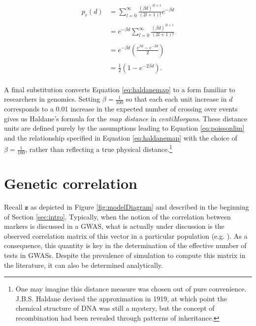 \documentclass{article}
\newcommand{\ve}[1]{\mathbf{#1}}           %
\begin{document}
\begin{equation} \label{eq:haldanemap}
  \begin{split}
    p_r(d) & = \sum_{l = 0}^{\infty} \frac{(\beta d)^{2l + 1}}{(2l + 1)!} e^{-\beta d} \\
    & \\
    & = e^{-\beta d} \sum_{l = 0}^{\infty} \frac{(\beta d)^{2l + 1}}{(2l + 1)!} \\
    & \\
    & = e^{-\beta d} \left ( \frac{e^{\beta d} - e^{- \beta d}}{2} \right ) \\
    & \\
    & = \frac{1}{2} \left ( 1 - e^{-2 \beta d} \right ) .\\
  \end{split}
\end{equation}

\noindent A final substitution converts Equation \ref{eq:haldanemap} to a form familiar to researchers in genomics. Setting $\beta = \frac{1}{100}$ so that each each unit increase in $d$ corresponds to a 0.01 increase in the expected number of crossing over events gives us Haldane's formula for the \textit{map distance} in \textit{centiMorgans}. These distance units are defined purely by the assumptions leading to Equation \ref{eq:poissonlim} and the relationship specified in Equation \ref{eq:haldanemap} with the choice of $\beta = \frac{1}{100}$, rather than reflecting a true physical distance.\footnote{One may imagine this distance measure was chosen out of pure convenience. J.B.S. Haldane devised the approximation in 1919, at which point the chemical structure of DNA was still a mystery, but the concept of recombination had been revealed through patterns of inheritance.}

\section{Genetic correlation} \label{sec:correlation}

Recall $\ve{z}$ as depicted in Figure \ref{fig:modelDiagram} and described in the beginning of Section \ref{sec:intro}. Typically, when the notion of the correlation between markers is discussed in a GWAS, what is actually under discussion is the observed correlation matrix of this vector in a particular population (e.g. \cite{cheverud2001}). As a consequence, this quantity is key in the determination of the effective number of tests in GWASs. Despite the prevalence of simulation to compute this matrix in the literature, it can also be determined analytically.
\end{document}
